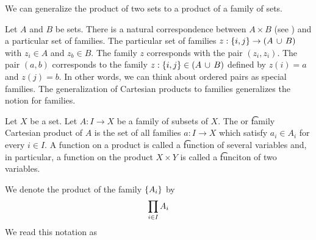 

We can generalize the product of two sets to a product of a family of sets.


Let $A$ and $B$ be sets.
There is a natural correspondence between $A \times B$ (see ) and a particular set of families.
The particular set of families $z: \{i, j\} \to (A \,\cup\, B)$ with $z_i \in A$ and $z_b \in B$.
The family $z$ corresponds with the pair $(z_i, z_i)$.
The pair $(a, b)$ corresponds to the family $z: \{i, j\} \in (A \,\cup\, B)$ defined by $z(i) = a$ and $z(j) = b$.
In other words, we can think about ordered pairs as special families.
The generalization of Cartesian products to families generalizes the notion for families.


Let $X$ be a set.
Let $A: I \to X$ be a family of subsets of $X$.
The  or \t{family Cartesian product} of $A$ is the set of all families $a: I \to X$ which satisfy $a_i \in A_i$ for every $i \in I$.
A function on a product is called a \t{function of several variables} and, in particular, a function on the product $X \times Y$ is called a \t{funciton of two variables.}


We denote the product of the family $\{A_i\}$ by
\[
  \prod_{i \in I} A_i
\]
We read this notation as 
%

